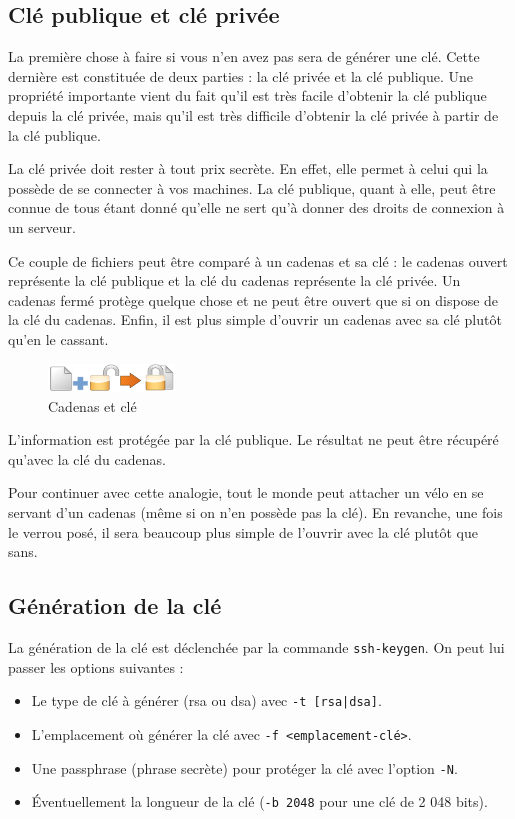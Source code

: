 \documentclass[hidelinks]{article}
\begin{document}
\subsection{Clé publique et clé privée}
La première chose à faire si vous n'en avez pas sera de générer une clé. Cette dernière est constituée de deux parties : la clé privée et la clé publique. Une propriété importante vient du fait qu'il est très facile d'obtenir la clé publique depuis la clé privée, mais qu'il est très difficile d'obtenir la clé privée à partir de la clé publique.

La clé privée doit rester à tout prix secrète. En effet, elle permet à celui qui la possède de se connecter à vos machines. La clé publique, quant à elle, peut être connue de tous étant donné qu'elle ne sert qu'à donner des droits de connexion à un serveur.

Ce couple de fichiers peut être comparé à un cadenas et sa clé : le cadenas ouvert représente la clé publique et la clé du cadenas représente la clé privée. Un cadenas fermé protège quelque chose et ne peut être ouvert que si on dispose de la clé du cadenas. Enfin, il est plus simple d'ouvrir un cadenas avec sa clé plutôt qu'en le cassant.
\begin{figure}
    \centering
    \includegraphics[width=0.3\textwidth]{img/ssh1.png}
    \caption{Cadenas et clé}
\end{figure}


L'information est protégée par la clé publique. Le résultat ne peut être récupéré qu'avec la clé du cadenas.

Pour continuer avec cette analogie, tout le monde peut attacher un vélo en se servant d'un cadenas (même si on n'en possède pas la clé). En revanche, une fois le verrou posé, il sera beaucoup plus simple de l'ouvrir avec la clé plutôt que sans.

\subsection{Génération de la clé}
La génération de la clé est déclenchée par la commande \texttt{ssh-keygen}. On peut lui passer les options suivantes :
\begin{itemize}
    \item Le type de clé à générer (rsa ou dsa) avec \texttt{-t [rsa|dsa]}.
    \item L'emplacement où générer la clé avec \texttt{-f <emplacement-clé>}.
    \item Une passphrase (phrase secrète) pour protéger la clé avec l'option \texttt{-N}.
    \item Éventuellement la longueur de la clé (\texttt{-b 2048} pour une clé de 2 048 bits).
\end{itemize}
\end{document}
